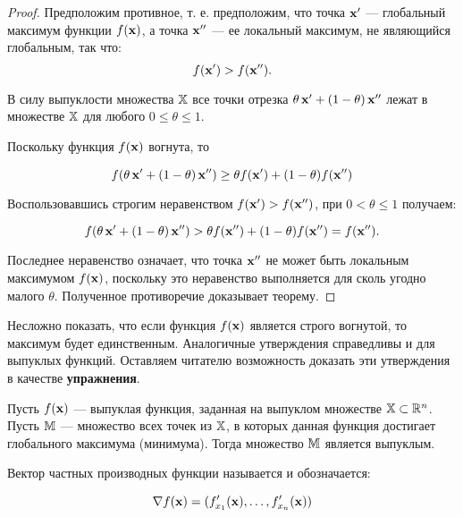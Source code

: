 \begin{proof}
Предположим противное, т. е. предположим, что точка $\mathbf{x'}$  ---
глобальный максимум функции $f(\mathbf{x})$, а точка $\mathbf{x''}$ --- ее
локальный максимум, не являющийся глобальным, так что:
\[
f(\mathbf{x'})>f(\mathbf{x''}).
\]

В силу выпуклости множества $\mathbb{X}$ все точки отрезка $\theta \,
\mathbf{x}' + (1-\theta)\,\mathbf{x}''$ лежат в множестве $\mathbb{X}$ для
любого $0 \leq \theta \leq 1$.

Поскольку функция $f(\mathbf{x})$ вогнута, то

\[
f(\theta \, \mathbf{x}' + (1-\theta)\,\mathbf{x}'') \geq \theta f(\mathbf{x}') +
(1-\theta) f(\mathbf{x}'')
\]

Воспользовавшись строгим неравенством $f(\mathbf{x'})>f(\mathbf{x''})$, при
$0 < \theta \leq 1$ получаем:

\[
f(\theta \, \mathbf{x}' + (1-\theta)\,\mathbf{x}'') > \theta f(\mathbf{x}'') +
(1-\theta) f(\mathbf{x}'')=f(\mathbf{x}'').
\]

Последнее неравенство означает, что точка $\mathbf{x''}$ не может быть
локальным максимумом $f(\mathbf{x})$, поскольку это неравенство
выполняется для сколь угодно малого $\theta$. Полученное
противоречие доказывает теорему.

\end{proof}

Несложно показать, что если функция $f(\mathbf{x})$ является строго
вогнутой, то максимум будет единственным. Аналогичные утверждения
справедливы и для выпуклых функций. Оставляем читателю возможность
доказать эти утверждения в качестве \textbf{упражнения}.


\begin{teo}

Пусть $f(\mathbf{x})$ --- выпуклая функция, заданная на выпуклом
множестве $\mathbb{X} \subset \mathbb{R}^n$. Пусть $\mathbb{M}$ --- множество всех
точек из $\mathbb{X}$, в которых данная функция достигает глобального
максимума (минимума). Тогда множество $\mathbb{M}$ является выпуклым.

\end{teo}


\begin{dfn}
Вектор частных производных функции называется
 и обозначается:

\[\nabla f(\mathbf{x})=(f'_{x_1}(\mathbf{x}),\ldots, f'_{x_n}(\mathbf{x}))\]

\end{dfn}

